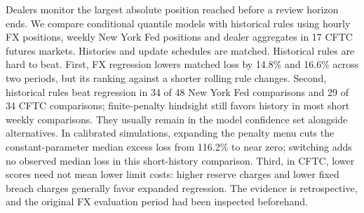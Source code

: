 Dealers monitor the largest absolute position reached before a review horizon ends. We compare conditional quantile models with historical rules using hourly FX positions, weekly New York Fed positions and dealer aggregates in 17 CFTC futures markets. Histories and update schedules are matched. Historical rules are hard to beat. First, FX regression lowers matched loss by 14.8\% and 16.6\% across two periods, but its ranking against a shorter rolling rule changes. Second, historical rules beat regression in 34 of 48 New York Fed comparisons and 29 of 34 CFTC comparisons; finite-penalty hindsight still favors history in most short weekly comparisons. They usually remain in the model confidence set alongside alternatives. In calibrated simulations, expanding the penalty menu cuts the constant-parameter median excess loss from 116.2\% to near zero; switching adds no observed median loss in this short-history comparison. Third, in CFTC, lower scores need not mean lower limit costs: higher reserve charges and lower fixed breach charges generally favor expanded regression. The evidence is retrospective, and the original FX evaluation period had been inspected beforehand.

